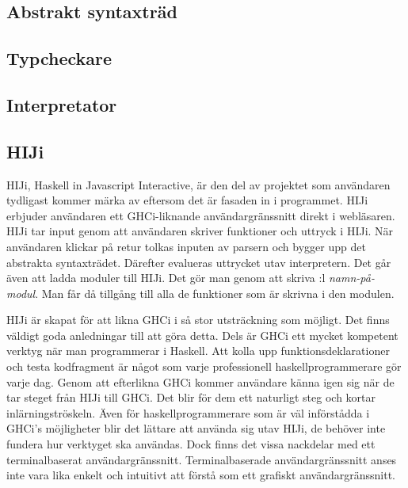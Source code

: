 \subsection{Abstrakt syntaxträd} 

\subsection{Typcheckare} 

\subsection{Interpretator}


\subsection{HIJi}
HIJi, Haskell in Javascript Interactive, är den del av projektet som användaren tydligast kommer märka av eftersom det är fasaden in i programmet.
HIJi erbjuder användaren ett GHCi-liknande användargränssnitt direkt i webläsaren. 
HIJi tar input genom att användaren skriver funktioner och uttryck i HIJi. När användaren klickar på retur tolkas inputen av parsern och bygger upp det abstrakta syntaxträdet. Därefter evalueras uttrycket utav interpretern.
Det går även att ladda moduler till HIJi. Det gör man genom att skriva :l \emph{namn-på-modul}. Man får då tillgång till alla de funktioner som är skrivna i den modulen. 

HIJi är skapat för att likna GHCi i så stor utsträckning som möjligt. Det finns väldigt goda anledningar till att göra detta. Dels är GHCi ett mycket kompetent verktyg när man programmerar i Haskell. Att kolla upp funktionsdeklarationer och testa kodfragment är något som varje professionell haskellprogrammerare gör varje dag. Genom att efterlikna GHCi kommer användare känna igen sig när de tar steget från HIJi till GHCi. Det blir för dem ett naturligt steg och kortar inlärningströskeln. Även för haskellprogrammerare som är väl införstådda i GHCi's möjligheter blir det lättare att använda sig utav HIJi, de behöver inte fundera hur verktyget ska användas.
Dock finns det vissa nackdelar med ett terminalbaserat användargränssnitt. Terminalbaserade användargränssnitt anses inte vara lika enkelt och intuitivt att förstå som ett grafiskt användargränssnitt. 



